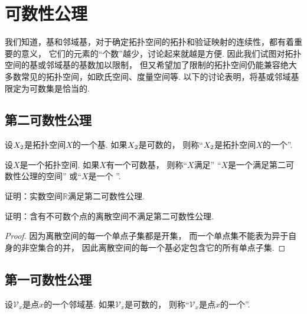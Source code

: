 \section{可数性公理}
我们知道，基和邻域基，对于确定拓扑空间的拓扑和验证映射的连续性，都有着重要的意义，
它们的元素的“个数”越少，讨论起来就越是方便.
因此我们试图对拓扑空间的基或邻域基的基数加以限制，
但又希望加了限制的拓扑空间仍能兼容绝大多数常见的拓扑空间，如欧氏空间、度量空间等.
以下的讨论表明，将基或邻域基限定为可数集是恰当的.

\subsection{第二可数性公理}
\begin{definition}
设\(X_2\)是拓扑空间\(X\)的一个基.
如果\(X_2\)是可数的，
则称“\(X_2\)是拓扑空间\(X\)的一个”.
\end{definition}

\begin{definition}
设\(X\)是一个拓扑空间.
如果\(X\)有一个可数基，
则称“\(X\)满足”
“\(X\)是一个满足第二可数性公理的空间”
或“\(X\)是一个 ”.
\end{definition}

\begin{example}
证明：实数空间\(\mathbb{R}\)满足第二可数性公理.
\end{example}

\begin{example}
证明：含有不可数个点的离散空间不满足第二可数性公理.
\begin{proof}
因为离散空间的每一个单点子集都是开集，
而一个单点集不能表为异于自身的非空集合的并，
因此离散空间的每一个基必定包含它的所有单点子集.
\end{proof}
\end{example}

\subsection{第一可数性公理}
\begin{definition}
\def\Vx{\mathscr{V}_x}
设\(\Vx\)是点\(x\)的一个邻域基.
如果\(\Vx\)是可数的，
则称“\(\Vx\)是点\(x\)的一个”.
\end{definition}

